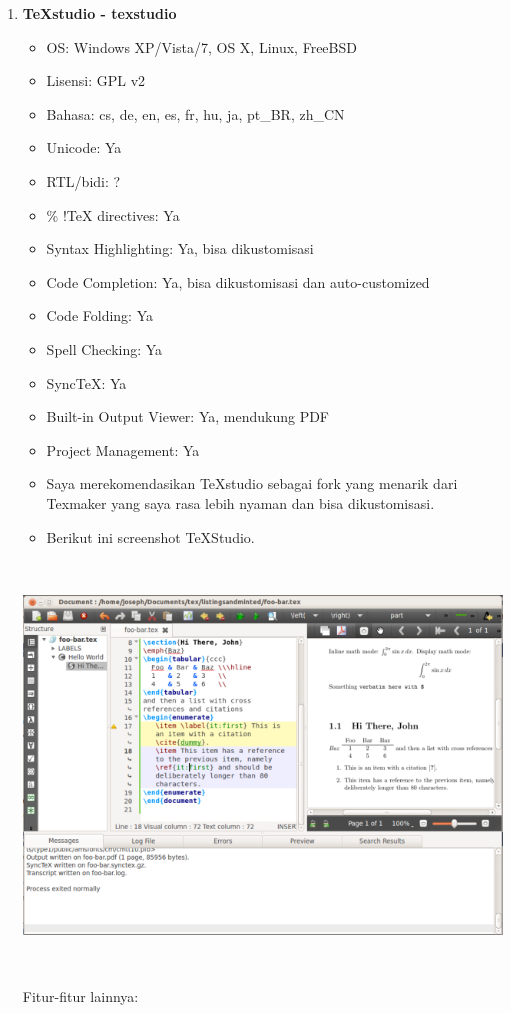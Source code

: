 \begin{enumerate}
\item \textbf{TeXstudio - texstudio}
\begin{itemize}
\item OS: Windows XP/Vista/7, OS X, Linux, FreeBSD
\item Lisensi: GPL v2
\item Bahasa: cs, de, en, es, fr, hu, ja, pt\_BR, zh\_CN
\item Unicode: Ya
\item RTL/bidi: ?
\item \% !TeX directives: Ya
\item Syntax Highlighting: Ya, bisa dikustomisasi
\item Code Completion: Ya, bisa dikustomisasi dan auto-customized
\item Code Folding: Ya
\item Spell Checking: Ya
\item SyncTeX: Ya
\item Built-in Output Viewer: Ya, mendukung PDF
\item Project Management: Ya
\item Saya merekomendasikan TeXstudio sebagai fork yang menarik dari Texmaker yang saya rasa lebih nyaman dan bisa dikustomisasi.
\item Berikut ini screenshot TeXStudio.
\end{itemize}
\includegraphics[width=15.23cm,height=10.79cm]{gambar/image7.jpg}

Fitur-fitur lainnya:


\end{enumerate}
